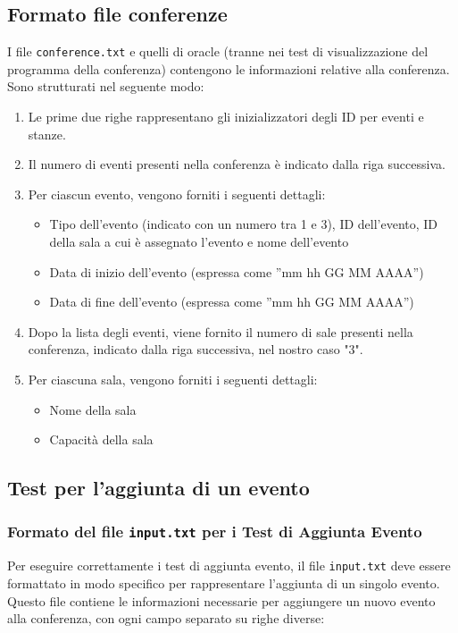 \documentclass[11pt]{scrartcl} %
\begin{document}
\subsection{Formato file conferenze}
I file \texttt{conference.txt} e quelli di oracle (tranne nei test di visualizzazione del programma della conferenza) contengono le informazioni relative alla conferenza. Sono strutturati nel seguente modo:

\begin{enumerate}
    \item Le prime due righe rappresentano gli inizializzatori degli ID per eventi e stanze.
    \item Il numero di eventi presenti nella conferenza è indicato dalla riga successiva.
    \item Per ciascun evento, vengono forniti i seguenti dettagli:
    \begin{itemize}
        \item Tipo dell'evento (indicato con un numero tra 1 e 3), ID dell'evento, ID della sala a cui è assegnato l'evento e  nome dell'evento
        \item Data di inizio dell'evento (espressa come ''mm hh GG MM AAAA'')
        \item Data di fine dell'evento (espressa come ''mm hh GG MM AAAA'')
    \end{itemize}
    \item Dopo la lista degli eventi, viene fornito il numero di sale presenti nella conferenza, indicato dalla riga successiva, nel nostro caso "3".
    \item Per ciascuna sala, vengono forniti i seguenti dettagli:
    \begin{itemize}
        \item Nome della sala
        \item Capacità della sala
    \end{itemize}
\end{enumerate}


\subsection{Test per l'aggiunta di un evento}
\subsubsection{Formato del file \texttt{input.txt} per i Test di Aggiunta Evento}

Per eseguire correttamente i test di aggiunta evento, il file \texttt{input.txt} deve essere formattato in modo specifico per rappresentare l'aggiunta di un singolo evento. Questo file contiene le informazioni necessarie per aggiungere un nuovo evento alla conferenza, con ogni campo separato su righe diverse:
\end{document}
